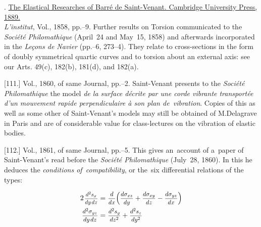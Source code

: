 \begin{tcolorbox}[breakable, enhanced, colback = green!11, before upper={\parindent3.2ex}, parbox = false]
\small%
\setlength{\abovedisplayskip}{2pt}\setlength{\belowdisplayskip}{2pt}%

\noindent
{}. \href{https://archive.org/details/elasticalresear00todhgoog/page/n92/}{The Elastical Researches of Barré de Saint-Venant. Cambridge University Press, 1889.}
\\[.55em]
%
\indent
[110.]
\emph{L’institut}, Vol., 1858, pp.\hbox{--}9. Further results on Torsion communicated to the \emph{Société Philomathique} (April~24 and May~15, 1858) and afterwards incorporated in the \emph{Leçons de Navier} (pp.\hbox{--}6, 273\hbox{--}4). They relate to cross-sections in the form of doubly symmetrical quartic curves and to torsion about an external axis\:: see our Arts. 49\:(c), 182\:(b), 181\:(d), and 182\:(a).

[111.]
Vol., 1860, of same Journal, pp.\hbox{--}2. Saint-Venant presents to the \emph{Société Philomathique} the model \emph{de la surface décrite par une corde vibrante transportée d’un mouvement rapide perpendiculaire à son plan de~vibration}. Copies of this as well as some other of Saint-Venant’s models may still be obtained of M.\;Delagrave in Paris and are of considerable value for class-lectures on the vibration of elastic bodies.

[112.]
Vol., 1861, of same Journal, pp.\hbox{--}5. This gives an~account of a~paper of Saint-Venant’s read before the \emph{Société Philomathique} (July~28, 1860). In this he deduces the \emph{conditions of~compatibility}, or the~six differential relations of the types\::

\begin{equation*}
\begin{array}{r@{\hspace{.7ex}}c@{\hspace{.7ex}}l}
2 \hspace{.2ex} \scalebox{.8}{$ \displaystyle \frac{d^2 s_{x}}{dy \hspace{.3ex} dz} $}
& = &
\scalebox{.86}{$ \displaystyle \frac{d}{dx} $}
\Bigl(
\scalebox{.86}{$ \displaystyle \frac{d \sigma_{xz}}{dy} $}
+ \scalebox{.86}{$ \displaystyle \frac{d \sigma_{xy}}{dz} $}
- \scalebox{.86}{$ \displaystyle \frac{d \sigma_{yz}}{dx} $}
\Bigr)
\\[.8em]
%
\scalebox{.86}{$ \displaystyle \frac{d^2 \sigma_{yz}}{dy \hspace{.3ex} dz} $}
& = &
\scalebox{.86}{$ \displaystyle \frac{d^2 s_{y}}{dz^2} $}
+ \scalebox{.86}{$ \displaystyle \frac{d^2 s_{z}}{dy^2} $}
\end{array}
\vspace{.2em}\end{equation*}


\end{tcolorbox}
